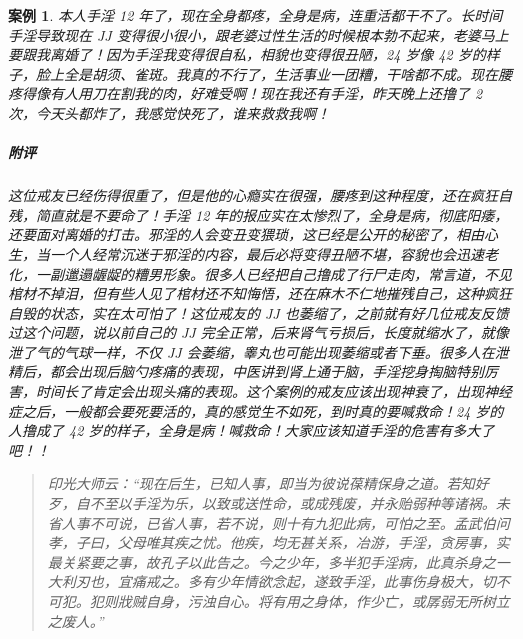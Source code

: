 \documentclass[fontset=founder]{ctexart}
\newtheorem{case}{案例}
\begin{document}
\begin{case}
    本人手淫 12 年了，现在全身都疼，全身是病，连重活都干不了。长时间手淫导致现在 JJ 变得很小很小，跟老婆过性生活的时候根本勃不起来，老婆马上要跟我离婚了！因为手淫我变得很自私，相貌也变得很丑陋，24 岁像 42 岁的样子，脸上全是胡须、雀斑。我真的不行了，生活事业一团糟，干啥都不成。现在腰疼得像有人用刀在割我的肉，好难受啊！现在我还有手淫，昨天晚上还撸了 2 次，今天头都炸了，我感觉快死了，谁来救救我啊！

    \subparagraph{附评} 这位戒友已经伤得很重了，但是他的心瘾实在很强，腰疼到这种程度，还在疯狂自残，简直就是不要命了！手淫 12 年的报应实在太惨烈了，全身是病，彻底阳痿，还要面对离婚的打击。邪淫的人会变丑变猥琐，这已经是公开的秘密了，相由心生，当一个人经常沉迷于邪淫的内容，最后必将变得丑陋不堪，容貌也会迅速老化，一副邋遢龌龊的糟男形象。很多人已经把自己撸成了行尸走肉，常言道，不见棺材不掉泪，但有些人见了棺材还不知悔悟，还在麻木不仁地摧残自己，这种疯狂自毁的状态，实在太可怕了！这位戒友的 JJ 也萎缩了，之前就有好几位戒友反馈过这个问题，说以前自己的 JJ 完全正常，后来肾气亏损后，长度就缩水了，就像泄了气的气球一样，不仅 JJ 会萎缩，睾丸也可能出现萎缩或者下垂。很多人在泄精后，都会出现后脑勺疼痛的表现，中医讲到肾上通于脑，手淫挖身掏脑特别厉害，时间长了肯定会出现头痛的表现。这个案例的戒友应该出现神衰了，出现神经症之后，一般都会要死要活的，真的感觉生不如死，到时真的要喊救命！24 岁的人撸成了 42 岁的样子，全身是病！喊救命！大家应该知道手淫的危害有多大了吧！！
\end{case}

\begin{quotation}\it
    印光大师云：“现在后生，已知人事，即当为彼说葆精保身之道。若知好歹，自不至以手淫为乐，以致或送性命，或成残废，并永贻弱种等诸祸。未省人事不可说，已省人事，若不说，则十有九犯此病，可怕之至。孟武伯问孝，子曰，父母唯其疾之忧。他疾，均无甚关系，冶游，手淫，贪房事，实最关紧要之事，故孔子以此告之。今之少年，多半犯手淫病，此真杀身之一大利刃也，宜痛戒之。多有少年情欲念起，遂致手淫，此事伤身极大，切不可犯。犯则戕贼自身，污浊自心。将有用之身体，作少亡，或孱弱无所树立之废人。”
\end{quotation}
\end{document}
